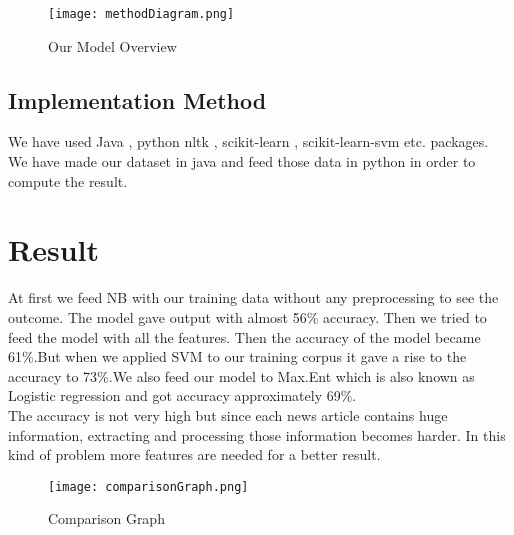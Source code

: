 \documentclass[a4paper,12pt]{report}
\begin{document}
\newpage
\begin{figure}
\centering
\texttt{[image: methodDiagram.png]}
\caption{Our Model Overview}
\label{fig:Overview of our system}
\end{figure}
\newpage


\subsection{Implementation Method}
We have used  Java \citep{java}, python nltk \citep{nltk}, scikit-learn \citep{feature}, scikit-learn-svm \citep{svm} etc. packages. We have made our dataset in java and feed those data in python in order to compute the result.

\section{Result}
At first we feed NB with our training data without any preprocessing to see the outcome. The model gave output with almost 56\% accuracy. Then we tried to
feed the model with all the features. Then the accuracy of the model became 61\%.But when we applied SVM to our training corpus it gave a rise to the accuracy to 73\%.We also feed our model to Max.Ent which is also known as Logistic regression and got accuracy approximately 69\%.
\\
The accuracy is not very high but since each news article contains huge information, extracting and processing those information becomes harder. In this kind of problem more features are needed for a better result.

\newpage
\begin{figure}
\centering
\texttt{[image: comparisonGraph.png]}
\caption{Comparison Graph}
\label{fig:Comparison among the different methods}
\end{figure}
\newpage
\end{document}
